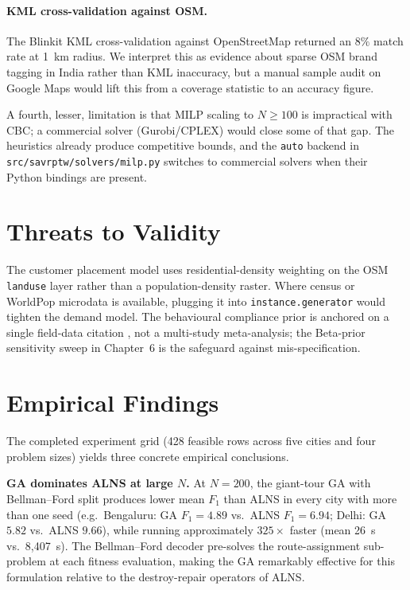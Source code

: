\paragraph{KML cross-validation against OSM.}
The Blinkit KML cross-validation against OpenStreetMap returned an
$8\%$ match rate at 1~km radius. We interpret this as evidence about
sparse OSM brand tagging in India rather than KML inaccuracy, but a
manual sample audit on Google Maps would lift this from a coverage
statistic to an accuracy figure.

A fourth, lesser, limitation is that MILP scaling to $N \geq 100$ is
impractical with CBC; a commercial solver (Gurobi/CPLEX) would close
some of that gap. The heuristics already produce competitive bounds,
and the \texttt{auto} backend in
\texttt{src/savrptw/solvers/milp.py} switches to commercial
solvers when their Python bindings are present.

\section{Threats to Validity}

The customer placement model uses residential-density weighting on
the OSM \texttt{landuse} layer rather than a population-density
raster. Where census or WorldPop microdata is available, plugging it
into \texttt{instance.generator} would tighten the demand model. The
behavioural compliance prior is anchored on a single field-data
citation \citep{das2020}, not a multi-study meta-analysis; the
Beta-prior sensitivity sweep in Chapter~6 is the safeguard against
mis-specification.

\section{Empirical Findings}

The completed experiment grid (428 feasible rows across five cities
and four problem sizes) yields three concrete empirical conclusions.

\textbf{GA dominates ALNS at large $N$.} At $N = 200$, the giant-tour
GA with Bellman--Ford split produces lower mean $F_1$ than ALNS in
every city with more than one seed (e.g.\ Bengaluru: GA $F_1 = 4.89$
vs.\ ALNS $F_1 = 6.94$; Delhi: GA $5.82$ vs.\ ALNS $9.66$), while
running approximately $325\times$ faster (mean 26~s vs.\ 8{,}407~s).
The Bellman--Ford decoder pre-solves the route-assignment sub-problem
at each fitness evaluation, making the GA remarkably effective for
this formulation relative to the destroy-repair operators of ALNS.

